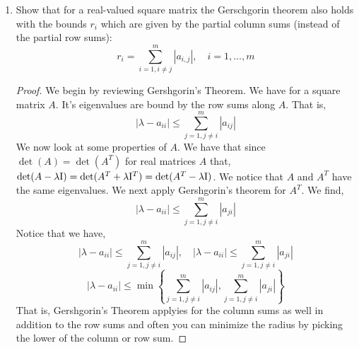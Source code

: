 \documentclass{article}
\begin{document}
\begin{enumerate}
\begin{proof}
    \[
        \det(M_1 - \lambda \I) = \det(AB - \lambda \I)\det(-\lambda \I)
    \]
    \[
        \det(M_2 - \lambda \I) = \det(-\lambda \I)\det(BA - \lambda \I)
    \]
    Notice that if $\lambda$ is an eigenvalue of its respective matrix then this determinant product must be equal to zero. We then take the case of each determinant can be zero. For $M_1$ we have that its eigenvalues are either zero, or the eigenvalues of $AB$ by definition. 
    \[
        \det(M_1 - \lambda \I) = 0, \quad \det(AB - \lambda \I) = 0,\quad  \det(-\lambda \I) = -\lambda = 0
    \]
    Similarly we have that the eigenvalues for $M_2$ are either zero or the eigenvalues of $BA$. Notice from a different homework problem (hw2), we have that the matrix products $AB$ and $BA$ have the same eigenvalues. This is because, 
    \[
        ABv = \lambda v, \quad Bv = y, \implies \quad BAy = \lambda y
    \]
    Finally both $M_1$ and $M_2$ have eigenvalues of zero and the eigenvalues of $AB/BA$. 
    
\end{proof}


\item %
Show that for a real-valued square matrix the Gerschgorin theorem also holds with the bounds $r_i$ which are given by the partial column sums (instead of the partial row sums):
\[
    r_i = \sum_{i=1, i\neq j}^m |a_{i,j}|, \quad i = 1, \dots, m
\]

\begin{proof}
    We begin by reviewing Gershgorin's Theorem. We have for a square matrix $A$. It's eigenvalues are bound by the row sums along $A$. That is,
    \[
        |\lambda - a_{ii}| \le \sum_{j = 1, j \neq i}^m |a_{ij}|
    \]
    We now look at some properties of $A$. We have that since $\det(A) = \det(A^T)$ for real matrices $A$ that, $\det(A - \lambda\mathrm{I}) = \det(A^T + \lambda\mathrm{I}^T) = \det(A^T - \lambda\mathrm{I})$. We notice that $A$ and $A^T$ have the same eigenvalues. We next apply Gershgorin's theorem for $A^T$. We find, 
    \[
        |\lambda - a_{ii}| \le \sum_{j=1, j\neq i}^m |a_{ji}|
    \]
    Notice that we have, 
    \[
        |\lambda - a_{ii}| \le \sum_{j = 1, j \neq i}^m |a_{ij}|, \quad |\lambda - a_{ii}| \le \sum_{j=1, j\neq i}^m |a_{ji}|
    \]
    \[
        |\lambda - a_{ii}| \le \min\left\{\sum_{j=1, j\neq i}^m |a_{ij}|, \sum_{j=1, j\neq i}^m |a_{ji}|\right\}
    \]
    That is, Gershgorin's Theorem applyies for the column sums as well in addition to the row sums and often you can minimize the radius by picking the lower of the column or row sum. 
\end{proof}



\end{enumerate}
\end{document}
